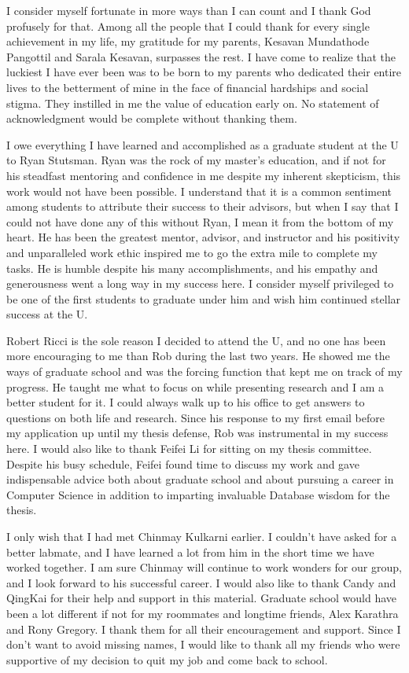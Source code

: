 I consider myself fortunate in more ways than I can count and I thank God profusely for that. 
Among all the people that I could thank for every single achievement in my life, my gratitude for my parents, Kesavan Mundathode Pangottil and Sarala Kesavan, surpasses the rest. 
I have come to realize that the luckiest I have ever been was to be born to my parents who dedicated their entire lives to the betterment of mine in the face of financial hardships and social stigma. 
They instilled in me the value of education early on. No statement of acknowledgment would be complete without thanking them.

I owe everything I have learned and accomplished as a graduate student at the U to Ryan Stutsman. 
Ryan was the rock of my master's education, and if not for his steadfast mentoring and confidence in me despite my inherent skepticism, this work would not have been possible. I understand that it is a common sentiment among students to attribute their success to their advisors, but when I say that I could not have done any of this without Ryan, I mean it from the bottom of my heart. 
He has been the greatest mentor, advisor, and instructor and his positivity and unparalleled work ethic inspired me to go the extra mile to complete my tasks. 
He is humble despite his many accomplishments, and his empathy and generousness went a long way in my success here. 
I consider myself privileged to be one of the first students to graduate under him and wish him continued stellar success at the U.

Robert Ricci is the sole reason I decided to attend the U, and no one has been more encouraging to me than Rob during the last two years. 
He showed me the ways of graduate school and was the forcing function that kept me on track of my progress. 
He taught me what to focus on while presenting research and I am a better student for it. 
I could always walk up to his office to get answers to questions on both life and research. 
Since his response to my first email before my application up until my thesis defense, Rob was instrumental in my success here. 
I would also like to thank Feifei Li for sitting on my thesis committee. Despite his busy schedule, Feifei found time to discuss my work and gave indispensable advice both about graduate school and about pursuing a career in Computer Science in addition to imparting invaluable Database wisdom for the thesis.

I only wish that I had met Chinmay Kulkarni earlier. 
I couldn't have asked for a better labmate, and I have learned a lot from him in the short time we have worked together. 
I am sure Chinmay will continue to work wonders for our group, and I look forward to his successful career. 
I would also like to thank Candy and QingKai for their help and support in this material. 
Graduate school would have been a lot different if not for my roommates and longtime friends, Alex Karathra and Rony Gregory. 
I thank them for all their encouragement and support. Since I don't want to avoid missing names, I would like to thank all my friends who were supportive of my decision to quit my job and come back to school.

